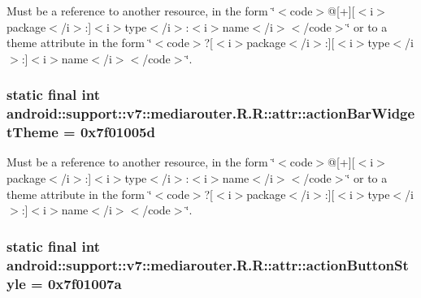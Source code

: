 Must be a reference to another resource, in the form \char`\"{}$<$code$>$@\mbox{[}+\mbox{]}\mbox{[}$<$i$>$package$<$/i$>$:\mbox{]}$<$i$>$type$<$/i$>$:$<$i$>$name$<$/i$>$$<$/code$>$\char`\"{} or to a theme attribute in the form \char`\"{}$<$code$>$?\mbox{[}$<$i$>$package$<$/i$>$:\mbox{]}\mbox{[}$<$i$>$type$<$/i$>$:\mbox{]}$<$i$>$name$<$/i$>$$<$/code$>$\char`\"{}. \hypertarget{classandroid_1_1support_1_1v7_1_1mediarouter_1_1_r_1_1attr_a5481007cf57a53433629f3259998358}{
\subsubsection[{actionBarWidgetTheme}]{\setlength{\rightskip}{0pt plus 5cm}static final int android::support::v7::mediarouter.R.R::attr::actionBarWidgetTheme = 0x7f01005d}}
\label{classandroid_1_1support_1_1v7_1_1mediarouter_1_1_r_1_1attr_a5481007cf57a53433629f3259998358}


Must be a reference to another resource, in the form \char`\"{}$<$code$>$@\mbox{[}+\mbox{]}\mbox{[}$<$i$>$package$<$/i$>$:\mbox{]}$<$i$>$type$<$/i$>$:$<$i$>$name$<$/i$>$$<$/code$>$\char`\"{} or to a theme attribute in the form \char`\"{}$<$code$>$?\mbox{[}$<$i$>$package$<$/i$>$:\mbox{]}\mbox{[}$<$i$>$type$<$/i$>$:\mbox{]}$<$i$>$name$<$/i$>$$<$/code$>$\char`\"{}. \hypertarget{classandroid_1_1support_1_1v7_1_1mediarouter_1_1_r_1_1attr_dcd2a73a8b0dbd9296a595e2f9a23a01}{
\subsubsection[{actionButtonStyle}]{\setlength{\rightskip}{0pt plus 5cm}static final int android::support::v7::mediarouter.R.R::attr::actionButtonStyle = 0x7f01007a}}
\label{classandroid_1_1support_1_1v7_1_1mediarouter_1_1_r_1_1attr_dcd2a73a8b0dbd9296a595e2f9a23a01}


